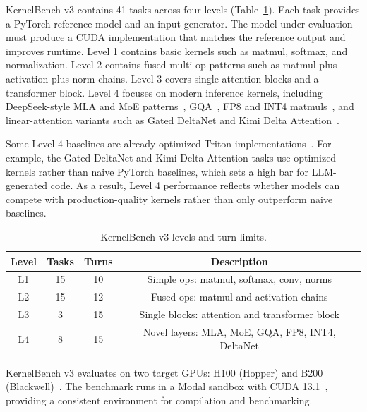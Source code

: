 KernelBench v3 contains 41 tasks across four levels (Table~\ref{tab:levels}). Each task provides a PyTorch reference model and an input generator. The model under evaluation must produce a CUDA implementation that matches the reference output and improves runtime. Level 1 contains basic kernels such as matmul, softmax, and normalization. Level 2 contains fused multi-op patterns such as matmul-plus-activation-plus-norm chains. Level 3 covers single attention blocks and a transformer block. Level 4 focuses on modern inference kernels, including DeepSeek-style MLA and MoE patterns~\cite{deepseek-v3}, GQA~\cite{gqa}, FP8 and INT4 matmuls~\cite{fp8-formats,int4-quant}, and linear-attention variants such as Gated DeltaNet and Kimi Delta Attention~\cite{gated-deltanet,kimi-linear}.

Some Level 4 baselines are already optimized Triton implementations~\cite{triton}. For example, the Gated DeltaNet and Kimi Delta Attention tasks use optimized kernels rather than naive PyTorch baselines, which sets a high bar for LLM-generated code. As a result, Level 4 performance reflects whether models can compete with production-quality kernels rather than only outperform naive baselines.

\begin{table}[t]
\centering
\caption{KernelBench v3 levels and turn limits.}
\label{tab:levels}
\begin{tabular}{cccc}
\toprule
Level & Tasks & Turns & Description \\
\midrule
L1 & 15 & 10 & Simple ops: matmul, softmax, conv, norms \\
L2 & 15 & 12 & Fused ops: matmul and activation chains \\
L3 & 3 & 15 & Single blocks: attention and transformer block \\
L4 & 8 & 15 & Novel layers: MLA, MoE, GQA, FP8, INT4, DeltaNet \\
\bottomrule
\end{tabular}
\end{table}

KernelBench v3 evaluates on two target GPUs: H100 (Hopper) and B200 (Blackwell)~\cite{nvidia-h100,nvidia-b200}. The benchmark runs in a Modal sandbox with CUDA 13.1~\cite{modal-docs,cuda-13-1}, providing a consistent environment for compilation and benchmarking.
